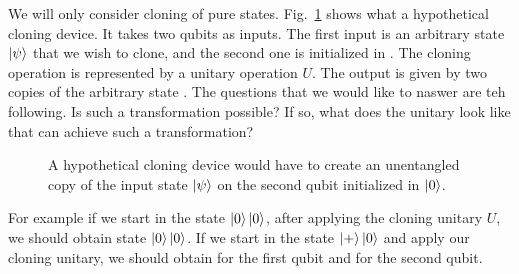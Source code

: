 We will only consider cloning of pure states.
Fig.~\ref{fig:cloner} shows what a hypothetical cloning device.
It takes two qubits as inputs.
The first input is an arbitrary state $\left| \psi \right\rangle$ that we wish to clone, and the second one is initialized in .
The cloning operation is represented by a  unitary operation $U$.
The output is given by two copies of the arbitrary state \ket{\psi}.
The questions that we would like to naswer are teh following.
Is such a transformation possible? If so, what does the unitary look like that can achieve such a transformation?
\begin{figure}[t]
    \centering
    \caption[A hypothetical cloning device.]{A hypothetical cloning device would have to create an unentangled copy of the input state $\left| \psi \right\rangle$ on the second qubit initialized in $\left| 0 \right\rangle$.}
    \label{fig:cloner}
\end{figure}

For example if we start in the state $\left| 0 \right\rangle\left| 0 \right\rangle$, after applying the cloning unitary $U$, we should obtain state $\left| 0 \right\rangle\left| 0 \right\rangle$. If we start in the state $\left| + \right\rangle\left| 0 \right\rangle$ and apply our cloning unitary, we should obtain \ket{+} for the first qubit and \ket{+} for the second qubit.

